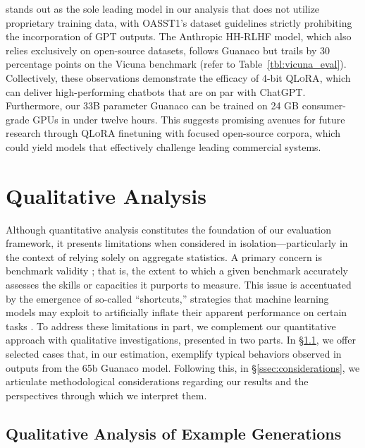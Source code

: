  stands out as the sole leading model in our analysis that does not utilize proprietary training data, with OASST1's dataset guidelines strictly prohibiting the incorporation of GPT outputs. The Anthropic HH-RLHF model, which also relies exclusively on open-source datasets, follows {Guanaco} but trails by 30 percentage points on the Vicuna benchmark (refer to Table~\ref{tbl:vicuna_eval}). Collectively, these observations demonstrate the efficacy of 4-bit \textsc{QLoRA}, which can deliver high-performing chatbots that are on par with ChatGPT. Furthermore, our 33B parameter {Guanaco} can be trained on 24 GB consumer-grade GPUs in under twelve hours. This suggests promising avenues for future research through \textsc{QLoRA} finetuning with focused open-source corpora, which could yield models that effectively challenge leading commercial systems.

\section{Qualitative Analysis}

Although quantitative analysis constitutes the foundation of our evaluation framework, it presents limitations when considered in isolation—particularly in the context of relying solely on aggregate statistics. A primary concern is benchmark validity \citep{liao2021we}; that is, the extent to which a given benchmark accurately assesses the skills or capacities it purports to measure. This issue is accentuated by the emergence of so-called ``shortcuts,'' strategies that machine learning models may exploit to artificially inflate their apparent performance on certain tasks \citep{gururangan2018annotation, poliak2018hypothesis}. To address these limitations in part, we complement our quantitative approach with qualitative investigations, presented in two parts. In \S\ref{ssec:examples}, we offer selected cases that, in our estimation, exemplify typical behaviors observed in outputs from the 65b {Guanaco} model. Following this, in \S\ref{ssec:considerations}, we articulate methodological considerations regarding our results and the perspectives through which we interpret them.

\subsection{Qualitative Analysis of Example Generations}
\label{ssec:examples}

